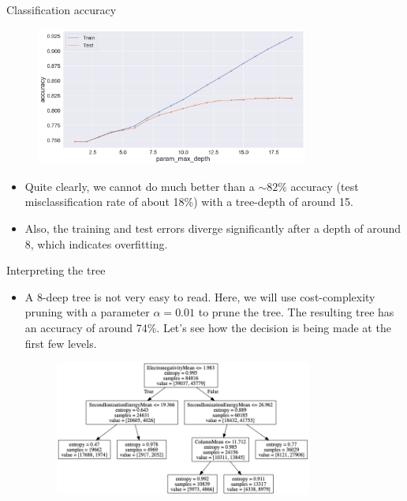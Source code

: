 \documentclass{beamer}
\begin{document}
\begin{frame}{Classification accuracy}
    \begin{figure}
        \centering
        \includegraphics[width=0.8\textwidth]{figures/accuracy_metal_insulator.png}
    \end{figure}
    \begin{itemize}
        \item Quite clearly, we cannot do much better than a $\sim 82\%$ accuracy (test misclassification rate of about 18\%) with a tree-depth of around 15.
        \item Also, the training and test errors diverge significantly after a depth of around 8, which indicates overfitting.
    \end{itemize}
\end{frame}


\begin{frame}{Interpreting the tree}
    \begin{itemize}
        \item A 8-deep tree is not very easy to read. Here, we will use cost-complexity pruning with a parameter $\alpha = 0.01$ to prune the tree. The resulting tree has an accuracy of around 74\%. Let's see how the decision is being made at the first few levels.
        \begin{figure}
            \centering
            \includegraphics[width=0.8\textwidth]{figures/metal_insulator_tree.png}
        \end{figure}
    \end{itemize}
\end{frame}
\end{document}
